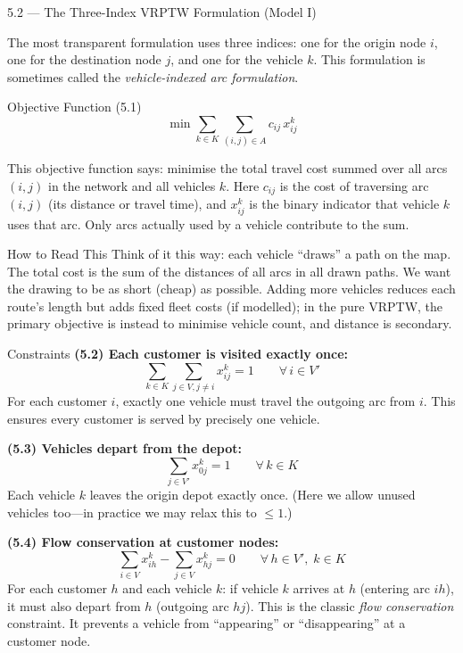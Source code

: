 \documentclass[aspectratio=169,10pt]{beamer}
\begin{document}
\begin{frame}[allowframebreaks]{5.2 --- The Three-Index VRPTW Formulation (Model I)}

The most transparent formulation uses three indices: one for the origin node $i$,
one for the destination node $j$, and one for the vehicle $k$.  This formulation is
sometimes called the \emph{vehicle-indexed arc formulation}.

\begin{block}{Objective Function (5.1)}
\[
  \min \sum_{k \in K} \sum_{(i,j) \in A} c_{ij} \, x_{ij}^k
\]
\end{block}

This objective function says: minimise the total travel cost summed over all arcs
$(i,j)$ in the network and all vehicles $k$.  Here $c_{ij}$ is the cost of
traversing arc $(i,j)$ (its distance or travel time), and $x_{ij}^k$ is the binary
indicator that vehicle $k$ uses that arc.  Only arcs actually used by a vehicle
contribute to the sum.

\begin{alertblock}{How to Read This}
Think of it this way: each vehicle ``draws'' a path on the map.  The total cost is
the sum of the distances of all arcs in all drawn paths.  We want the drawing to be
as short (cheap) as possible.  Adding more vehicles reduces each route's length but
adds fixed fleet costs (if modelled); in the pure VRPTW, the primary objective is
instead to minimise vehicle count, and distance is secondary.
\end{alertblock}

\framebreak

\begin{block}{Constraints}
\textbf{(5.2) Each customer is visited exactly once:}
\[
  \sum_{k \in K} \sum_{j \in V, j \neq i} x_{ij}^k = 1
  \qquad \forall\, i \in V'
\]
For each customer $i$, exactly one vehicle must travel the outgoing arc from $i$.
This ensures every customer is served by precisely one vehicle.

\medskip
\textbf{(5.3) Vehicles depart from the depot:}
\[
  \sum_{j \in V'} x_{0j}^k = 1
  \qquad \forall\, k \in K
\]
Each vehicle $k$ leaves the origin depot exactly once.  (Here we allow unused
vehicles too---in practice we may relax this to $\leq 1$.)

\medskip
\textbf{(5.4) Flow conservation at customer nodes:}
\[
  \sum_{i \in V} x_{ih}^k - \sum_{j \in V} x_{hj}^k = 0
  \qquad \forall\, h \in V',\; k \in K
\]
For each customer $h$ and each vehicle $k$: if vehicle $k$ arrives at $h$ (entering
arc $ih$), it must also depart from $h$ (outgoing arc $hj$).  This is the classic
\emph{flow conservation} constraint.  It prevents a vehicle from ``appearing'' or
``disappearing'' at a customer node.
\end{block}


\end{frame}
\end{document}
